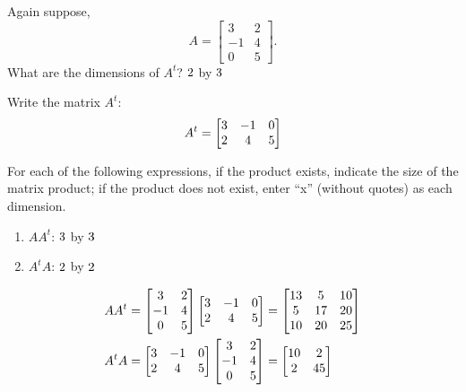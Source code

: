 \documentclass[handout]{ximera}
\begin{document}
\begin{exercise}
Again suppose, 
\[
A = \begin{bmatrix}  3   &  2\\   -1  &  4\\   0   &  5 \end{bmatrix}.  
\]
What are the dimensions of $A^t$?  ${2}$ by ${3}$

\begin{exercise}
Write the matrix $A^t$:
\[
A^t = \begin{bmatrix} {3} & {-1} & {0} \\ 
	{2} & {4} & {5} \end{bmatrix}
\]
\begin{exercise}
For each of the following expressions, if the product exists, indicate the size of the matrix product; if the product does not exist, enter ``x'' (without quotes) as each dimension. 
\begin{enumerate}
\item $AA^t$: ${3}$ by ${3}$
\item $A^tA$: ${2}$ by ${2}$
\end{enumerate}
\begin{exercise}
\begin{align*}
AA^t &= \begin{bmatrix}  3   &  2\\   -1  &  4\\   0   &  5 \end{bmatrix}
	 \begin{bmatrix} 3 & -1 & 0 \\ 2 & 4 & 5 \end{bmatrix}
     = \begin{bmatrix}  {13}  &   {5}  &  {10}\\   
	{5}   & {17}  &  {20}\\  
	{10}  &  {20}  &  {25}  \end{bmatrix} \\
A^tA &= \begin{bmatrix} 3 & -1 & 0 \\ 2 & 4 & 5 \end{bmatrix}
	\begin{bmatrix}  3   &  2\\   -1  &  4\\   0   &  5 \end{bmatrix}
	= \begin{bmatrix}    {10}  &   {2}\\   {2}  &  {45}  \end{bmatrix}
\end{align*}


\end{exercise}
\end{exercise}
\end{exercise}
\end{exercise}
\end{document}
